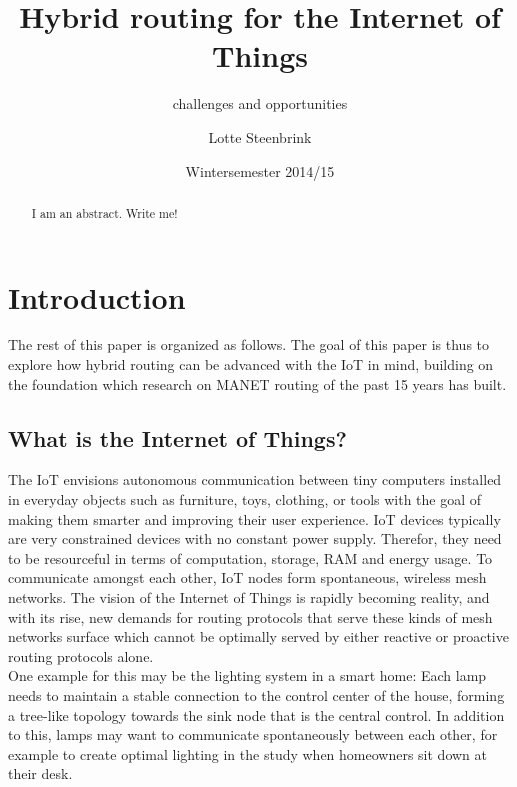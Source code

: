 \documentclass[a4paper,10pt]{scrartcl}
\begin{document}
\title{Hybrid routing for the Internet of Things}
\subtitle{challenges and opportunities}
\author{Lotte Steenbrink}
\date{Wintersemester 2014/15}
\maketitle

\begin{abstract}
I am an abstract. Write me!
\end{abstract}

\section{Introduction}
\label{sec:Intro}
The rest of this paper is organized as follows. 
The goal of this paper is thus to explore how hybrid routing can be advanced with the \gls{IoT} in mind, building on the foundation which research on \gls{MANET} routing of the past 15 years has built.\\ 

\subsection{What is the Internet of Things?}
\label{subsec:IoT}
The \gls{IoT} envisions autonomous communication between tiny computers installed in everyday objects such as furniture, toys, clothing, or tools with the goal of making them smarter and improving their user experience. IoT devices typically are very constrained devices with no constant power supply. Therefor, they need to be resourceful in terms of computation, storage, RAM and energy usage.
To communicate amongst each other, IoT nodes form spontaneous, wireless mesh networks.
The vision of the Internet of Things is rapidly becoming reality, and with its rise, new demands for routing protocols that serve these kinds of mesh networks surface which cannot be optimally served by either reactive or proactive routing protocols alone.\\
One example for this may be the lighting system in a smart home: Each lamp needs to maintain a stable connection to the control center of the house, forming a tree-like topology towards the sink node that is the central control. In addition to this, lamps may want to communicate spontaneously between each other, for example to create optimal lighting in the study when homeowners sit down at their desk.
\end{document}
